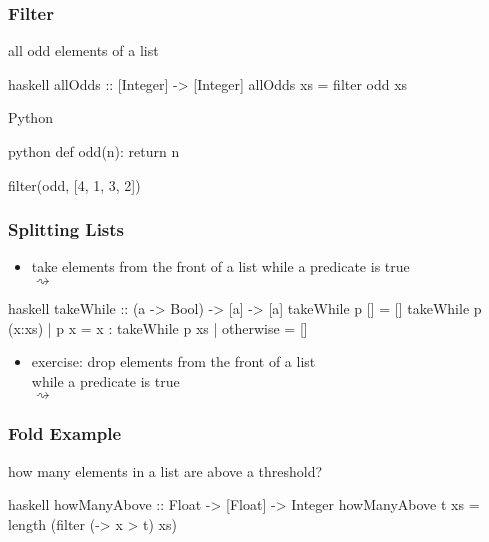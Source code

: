 \documentclass[dvipsnames]{beamer}
\theoremstyle{plain}
\begin{document}
\begin{frame}[fragile]
  \frametitle{Filter}

  \begin{exampleblock}{all odd elements of a list}
    \begin{pygments}{haskell}
allOdds :: [Integer] -> [Integer]
allOdds xs = filter odd xs
    \end{pygments}
  \end{exampleblock}

  \bigskip
  \begin{exampleblock}{Python}
    \begin{pygments}{python}
def odd(n):
    return n %

filter(odd, [4, 1, 3, 2])
    \end{pygments}
  \end{exampleblock}
\end{frame}

\begin{frame}[fragile]
  \frametitle{Splitting Lists}

  \begin{itemize}
    \item take elements from the front of a list while a predicate is true\\
       $\rightsquigarrow$
  \end{itemize}

  \begin{exampleblock}{}
    \begin{pygments}{haskell}
takeWhile :: (a -> Bool) -> [a] -> [a]
takeWhile p []     = []
takeWhile p (x:xs)
  | p x       = x : takeWhile p xs
  | otherwise = []
    \end{pygments}
  \end{exampleblock}

  \pause
  \begin{itemize}
    \item exercise: drop elements from the front of a list\\
      while a predicate is true\\
       $\rightsquigarrow$
  \end{itemize}
\end{frame}

\begin{frame}[fragile]
  \frametitle{Fold Example}

  \begin{exampleblock}{how many elements in a list are above a threshold?}
    \begin{pygments}{haskell}
howManyAbove :: Float -> [Float] -> Integer
howManyAbove t xs = length (filter (\x -> x > t) xs)
    \end{pygments}
  \end{exampleblock}
\end{frame}
\end{document}
